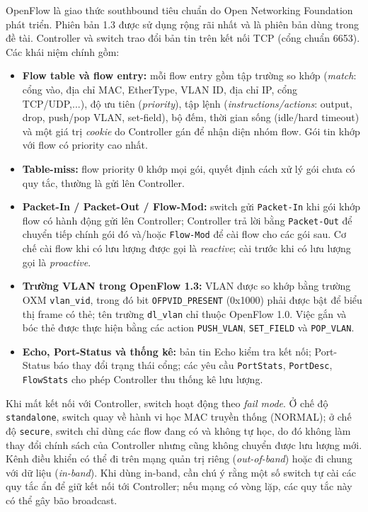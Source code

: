 OpenFlow là giao thức southbound tiêu chuẩn do Open Networking Foundation phát triển. Phiên bản 1.3 được sử dụng rộng rãi nhất và là phiên bản dùng trong đề tài. Controller và switch trao đổi bản tin trên kết nối TCP (cổng chuẩn 6653). Các khái niệm chính gồm:

\begin{itemize}
    \item \textbf{Flow table và flow entry:} mỗi flow entry gồm tập trường so khớp (\textit{match}: cổng vào, địa chỉ MAC, EtherType, VLAN ID, địa chỉ IP, cổng TCP/UDP,...), độ ưu tiên (\textit{priority}), tập lệnh (\textit{instructions/actions}: output, drop, push/pop VLAN, set-field), bộ đếm, thời gian sống (idle/hard timeout) và một giá trị \textit{cookie} do Controller gán để nhận diện nhóm flow. Gói tin khớp với flow có priority cao nhất.
    \item \textbf{Table-miss:} flow priority 0 khớp mọi gói, quyết định cách xử lý gói chưa có quy tắc, thường là gửi lên Controller.
    \item \textbf{Packet-In / Packet-Out / Flow-Mod:} switch gửi \texttt{Packet-In} khi gói khớp flow có hành động gửi lên Controller; Controller trả lời bằng \texttt{Packet-Out} để chuyển tiếp chính gói đó và/hoặc \texttt{Flow-Mod} để cài flow cho các gói sau. Cơ chế cài flow khi có lưu lượng được gọi là \textit{reactive}; cài trước khi có lưu lượng gọi là \textit{proactive}.
    \item \textbf{Trường VLAN trong OpenFlow 1.3:} VLAN được so khớp bằng trường OXM \texttt{vlan\_vid}, trong đó bit \texttt{OFPVID\_PRESENT} (0x1000) phải được bật để biểu thị frame có thẻ; tên trường \texttt{dl\_vlan} chỉ thuộc OpenFlow 1.0. Việc gắn và bóc thẻ được thực hiện bằng các action \texttt{PUSH\_VLAN}, \texttt{SET\_FIELD} và \texttt{POP\_VLAN}.
    \item \textbf{Echo, Port-Status và thống kê:} bản tin Echo kiểm tra kết nối; Port-Status báo thay đổi trạng thái cổng; các yêu cầu \texttt{PortStats}, \texttt{PortDesc}, \texttt{FlowStats} cho phép Controller thu thống kê lưu lượng.
\end{itemize}

Khi mất kết nối với Controller, switch hoạt động theo \textit{fail mode}. Ở chế độ \texttt{standalone}, switch quay về hành vi học MAC truyền thống (NORMAL); ở chế độ \texttt{secure}, switch chỉ dùng các flow đang có và không tự học, do đó không làm thay đổi chính sách của Controller nhưng cũng không chuyển được lưu lượng mới. Kênh điều khiển có thể đi trên mạng quản trị riêng (\textit{out-of-band}) hoặc đi chung với dữ liệu (\textit{in-band}). Khi dùng in-band, cần chú ý rằng một số switch tự cài các quy tắc ẩn để giữ kết nối tới Controller; nếu mạng có vòng lặp, các quy tắc này có thể gây bão broadcast.

